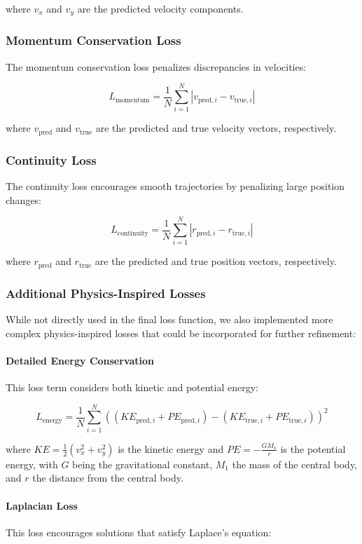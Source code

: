 \documentclass[12pt,a4paper]{article}
\begin{document}
where $v_x$ and $v_y$ are the predicted velocity components.

\subsubsection{Momentum Conservation Loss}
The momentum conservation loss penalizes discrepancies in velocities:

\[ L_{\text{momentum}} = \frac{1}{N} \sum_{i=1}^N |v_{\text{pred},i} - v_{\text{true},i}| \]

where $v_{\text{pred}}$ and $v_{\text{true}}$ are the predicted and true velocity vectors, respectively.

\subsubsection{Continuity Loss}
The continuity loss encourages smooth trajectories by penalizing large position changes:

\[ L_{\text{continuity}} = \frac{1}{N} \sum_{i=1}^N |r_{\text{pred},i} - r_{\text{true},i}| \]

where $r_{\text{pred}}$ and $r_{\text{true}}$ are the predicted and true position vectors, respectively.

\subsubsection{Additional Physics-Inspired Losses}
While not directly used in the final loss function, we also implemented more complex physics-inspired losses that could be incorporated for further refinement:

\paragraph{Detailed Energy Conservation}
This loss term considers both kinetic and potential energy:

\[ L_{\text{energy}} = \frac{1}{N} \sum_{i=1}^N \left(\left(KE_{\text{pred},i} + PE_{\text{pred},i}\right) - \left(KE_{\text{true},i} + PE_{\text{true},i}\right)\right)^2 \]

where $KE = \frac{1}{2}(v_x^2 + v_y^2)$ is the kinetic energy and $PE = -\frac{GM_1}{r}$ is the potential energy, with $G$ being the gravitational constant, $M_1$ the mass of the central body, and $r$ the distance from the central body.

\paragraph{Laplacian Loss}
This loss encourages solutions that satisfy Laplace's equation:
\end{document}
